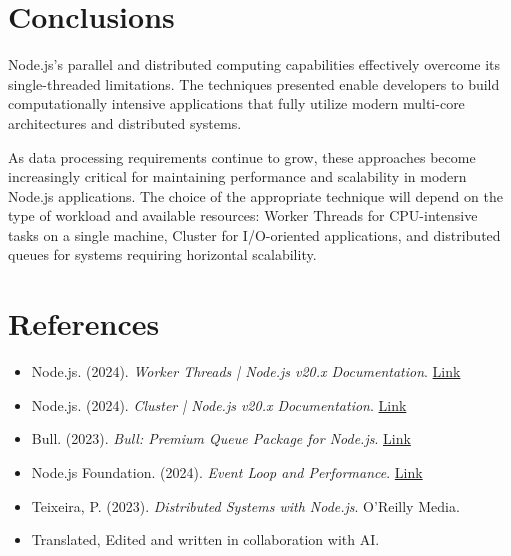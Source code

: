 \documentclass[12pt,letterpaper]{article}
\begin{document}
\section{Conclusions}

Node.js's parallel and distributed computing capabilities effectively overcome its single-threaded limitations. The techniques presented enable developers to build computationally intensive applications that fully utilize modern multi-core architectures and distributed systems.

As data processing requirements continue to grow, these approaches become increasingly critical for maintaining performance and scalability in modern Node.js applications. The choice of the appropriate technique will depend on the type of workload and available resources: Worker Threads for CPU-intensive tasks on a single machine, Cluster for I/O-oriented applications, and distributed queues for systems requiring horizontal scalability.

\section{References}

\begin{itemize}
    \item Node.js. (2024). \textit{Worker Threads | Node.js v20.x Documentation}. \href{https://nodejs.org/docs/latest-v20.x/api/worker_threads.html}{Link}
    
    \item Node.js. (2024). \textit{Cluster | Node.js v20.x Documentation}. \href{https://nodejs.org/docs/latest-v20.x/api/cluster.html}{Link}
    
    \item Bull. (2023). \textit{Bull: Premium Queue Package for Node.js}. \href{https://github.com/OptimalBits/bull}{Link}
    
    \item Node.js Foundation. (2024). \textit{Event Loop and Performance}. \href{https://nodejs.org/en/docs/guides/event-loop-timers-and-nexttick/}{Link}
    
    \item Teixeira, P. (2023). \textit{Distributed Systems with Node.js}. O'Reilly Media.

    \item Translated, Edited and written in collaboration with AI.
\end{itemize}
\end{document}
